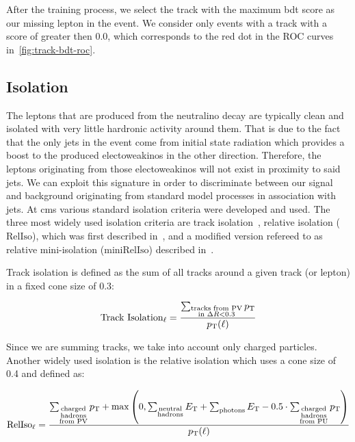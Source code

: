 After the training process, we select the track with the maximum \gls{bdt} score as our missing lepton in the event. We consider only events with a track with a score of greater then 0.0, which corresponds to the red dot in the ROC curves in~\ref{fig:track-bdt-roc}.

\clearpage
\subsection{Isolation}
\label{sec:isolation}

The leptons that are produced from the neutralino decay \neuttdecay are typically clean and isolated with very little hardronic activity around them. That is due to the fact that the only jets in the event come from initial state radiation which provides a boost to the produced electoweakinos in the other direction. Therefore, the leptons originating from those electoweakinos will not exist in proximity to said jets. We can exploit this signature in order to discriminate between our signal and background originating from standard model processes in association with jets. At \gls{cms} various standard isolation criteria were developed and used. The three most widely used isolation criteria are track isolation~\cite{muon-pog-recommendations}, relative isolation ($\mathrm{RelIso}$), which was first described in~\cite{Chatrchyan_2011}, and a modified version refereed to as relative mini-isolation ($\mathrm{miniRelIso}$) described in~\cite{Rehermann_2011}.

Track isolation is defined as the \pt sum of all tracks around a given track (or lepton) in a fixed cone size of 0.3:

\begin{equation}
\text{Track Isolation}_\ell = \frac{ \sum_{\substack{\text{tracks from PV}\\ \text{in } \Delta R<0.3}}p_{\mathrm{T}}}{ p_{\mathrm{T}}(\ell) } 
\end{equation}

Since we are summing tracks, we take into account only charged particles. Another widely used isolation is the relative isolation which uses a cone size of 0.4 and defined as:

\begin{equation}
\text{RelIso}_\ell = \frac{ \sum_{\substack{\text{charged}\\\text{hadrons}\\\text{from PV}}}p_{\mathrm{T}} + \max\left(0, \sum_{\substack{\text{neutral}\\\text{hadrons}}}E_{\mathrm{T}} + \sum_{\text{photons}}E_{\mathrm{T}} - 0.5\cdot \sum_{\substack{\text{charged}\\\text{hadrons}\\\text{from PU}}}p_{\mathrm{T}} \right) }{ p_{\mathrm{T}}(\ell) }
\end{equation}

